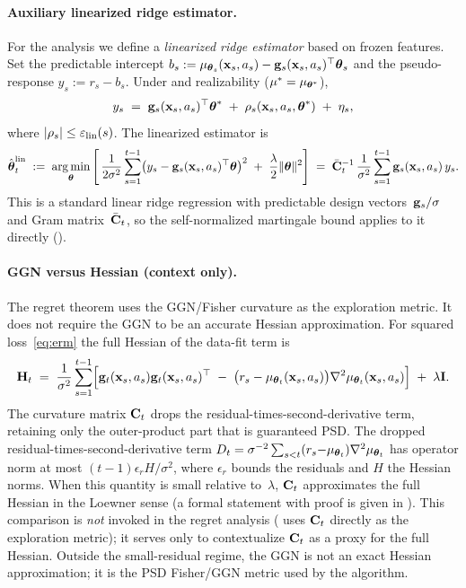 \documentclass[twoside]{article}
\begin{document}
\paragraph{Auxiliary linearized ridge estimator.}
For the analysis we define a \emph{linearized ridge estimator} based on
frozen features.  Set the predictable intercept
$b_s := \mu_{\boldsymbol{\theta}_s}(\mathbf{x}_s,a_s) - \mathbf{g}_s(\mathbf{x}_s,a_s)^\top\boldsymbol{\theta}_s$
and the pseudo-response $y_s := r_s - b_s$.
Under  and realizability ($\mu^*=\mu_{\boldsymbol{\theta}^*}$),
\begin{equation}\label{eq:pseudo-response}
  y_s
  \;=\;
  \mathbf{g}_s(\mathbf{x}_s,a_s)^\top\boldsymbol{\theta}^*
  \;+\;
  \rho_s(\mathbf{x}_s,a_s,\boldsymbol{\theta}^*)
  \;+\;
  \eta_s,
\end{equation}
where $|\rho_s|\le\varepsilon_{\mathrm{lin}}(s)$.
The linearized estimator is
\begin{equation}\label{eq:thetahat-lin}
  \hat{\boldsymbol{\theta}}_t^{\mathrm{lin}}
  \;:=\;
  \operatorname*{arg\,min}_{\boldsymbol{\theta}}\,\Biggl[\,
    \frac{1}{2\sigma^2}\sum_{s=1}^{t-1}
      \bigl(y_s - \mathbf{g}_s(\mathbf{x}_s,a_s)^\top\boldsymbol{\theta}\bigr)^2
    \;+\;\frac{\lambda}{2}\|\boldsymbol{\theta}\|^2
  \Biggr]
  \;=\;
  \bar{\mathbf{C}}_t^{-1}\,\frac{1}{\sigma^2}
    \sum_{s=1}^{t-1}\mathbf{g}_s(\mathbf{x}_s,a_s)\,y_s.
\end{equation}
This is a standard linear ridge regression with predictable design
vectors~$\mathbf{g}_s/\sigma$ and Gram matrix~$\bar{\mathbf{C}}_t$, so the
self-normalized martingale bound
\citep{abbasi2011improved} applies to it directly
().



\paragraph{GGN versus Hessian (context only).}
The regret theorem uses the GGN/Fisher curvature as the exploration
metric.  It does not require the GGN to be an accurate Hessian
approximation.
For squared loss~\eqref{eq:erm} the full Hessian of the data-fit term is
\[
  \mathbf{H}_t \;=\; \frac{1}{\sigma^2}\sum_{s=1}^{t-1}
  \Bigl[\mathbf{g}_t(\mathbf{x}_s,a_s)\mathbf{g}_t(\mathbf{x}_s,a_s)^\top
  \;-\; \bigl(r_s - \mu_{\boldsymbol{\theta}_t}(\mathbf{x}_s,a_s)\bigr)
        \nabla^2\mu_{\boldsymbol{\theta}_t}(\mathbf{x}_s,a_s)\Bigr]
  \;+\;\lambda\mathbf{I}.
\]
The curvature matrix $\mathbf{C}_t$ drops the residual-times-second-derivative
term, retaining only the outer-product part that is guaranteed PSD.
The dropped residual-times-second-derivative term
$D_t=\sigma^{-2}\sum_{s<t}(r_s{-}\mu_{\boldsymbol{\theta}_t})\nabla^2\mu_{\boldsymbol{\theta}_t}$
has operator norm at most
$(t{-}1)\epsilon_r H/\sigma^2$, where $\epsilon_r$ bounds the residuals and
$H$ the Hessian norms.
When this quantity is small relative to~$\lambda$, $\mathbf{C}_t$ approximates
the full Hessian in the Loewner sense (a formal statement with proof is
given in ).
This comparison is \emph{not} invoked in the regret analysis
( uses $\mathbf{C}_t$ directly as the exploration metric);
it serves only to contextualize $\mathbf{C}_t$ as a proxy for the full
Hessian.  Outside the small-residual regime, the GGN is not an exact
Hessian approximation; it is the PSD Fisher/GGN metric used by the
algorithm.
\end{document}
